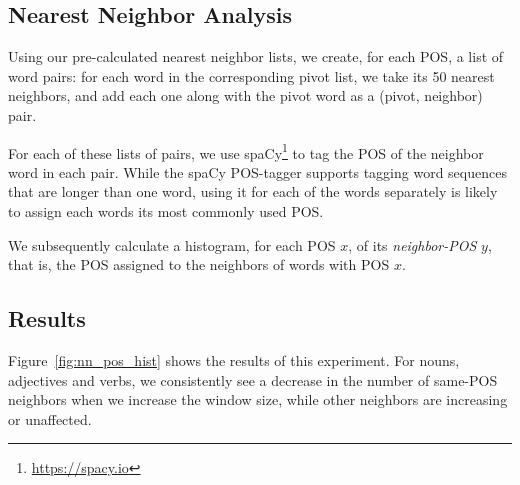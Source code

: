\documentclass[11pt,a4paper]{article}
\begin{document}
    \subsection{Nearest Neighbor Analysis}\label{sec:nn_analysis}
    
    Using our pre-calculated nearest neighbor lists, we create, for each
    POS, a list of word pairs: for each word in the corresponding pivot list,
    we take its 50 nearest neighbors, and add each one along with the pivot word
    as a (pivot, neighbor) pair.
    
    For each of these lists of pairs, we use spaCy\footnote{\url{https://spacy.io}}
    to tag the POS of the neighbor word in each pair.
    While the spaCy POS-tagger supports tagging word sequences that are longer
    than one word, using it for each of the words separately is likely
    to assign each words its most commonly used POS.
    
    We subsequently calculate a histogram, for each POS $x$, of its
    \textit{neighbor-POS} $y$, that is, the POS assigned to the neighbors of
    words with POS $x$.
    
    \subsection{Results}\label{sec:nn_results}
    
    Figure~\ref{fig:nn_pos_hist} shows the results of this experiment.
    For nouns, adjectives and verbs, we consistently see a decrease in
    the number of same-POS neighbors when we increase the window size,
    while other neighbors are increasing or unaffected.
    
\end{document}
